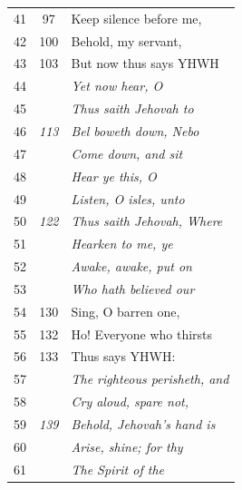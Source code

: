 \documentclass{article}
\newlength{\minipageheight}
\begin{document}
\begin{minipage}[r][\minipageheight][t]{3in}
\begin{longtable}{ccl}
        41          & 97           & Keep silence before me,                 \\
        42          & 100          & Behold, my servant,                     \\
        43          & 103          & But now thus says YHWH                  \\
        44          &              & \textit{Yet now hear, O}                \\
        45          &              & \textit{Thus saith Jehovah to}          \\
        46          & \textit{113} & \textit{Bel boweth down, Nebo}          \\
        47          &              & \textit{Come down, and sit}             \\
        48          &              & \textit{Hear ye this, O}                \\
        49          &              & \textit{Listen, O isles, unto}          \\
        50          & \textit{122} & \textit{Thus saith Jehovah, Where}      \\
        51          &              & \textit{Hearken to me, ye}              \\
        52          &              & \textit{Awake, awake, put on}           \\
        53          &              & \textit{Who hath believed our}          \\
        54          & 130          & Sing, O barren one,                     \\
        55          & 132          & Ho! Everyone who thirsts                \\
        56          & 133          & Thus says YHWH:                         \\
        57          &              & \textit{The righteous perisheth, and}   \\
        58          &              & \textit{Cry aloud, spare not,}          \\
        59          & \textit{139} & \textit{Behold, Jehovah’s hand is}      \\
        60          &              & \textit{Arise, shine; for thy}          \\
        61          &              & \textit{The Spirit of the}              \\
    \end{longtable}
\end{minipage}%
\end{document}
